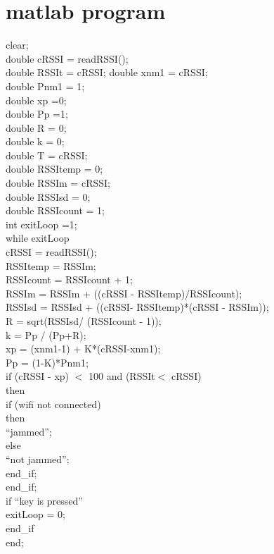 \documentclass[a4paper,10pt]{article}
\begin{document}
\section{matlab program}
clear;\\
double cRSSI = readRSSI(); \\
double RSSIt = cRSSI;
double xnm1 = cRSSI;\\
double Pnm1 = 1; \\
double xp =0;\\
double Pp =1;\\
double R = 0;\\
double k = 0;\\
double T = cRSSI;\\
double RSSItemp = 0;\\
double RSSIm = cRSSI;\\
double RSSIsd = 0;\\
double RSSIcount = 1;\\
int exitLoop =1;\\
while exitLoop\\
\indent  cRSSI = readRSSI();\\
\indent  RSSItemp = RSSIm;\\
\indent  RSSIcount = RSSIcount + 1;\\
\indent  RSSIm = RSSIm + ((cRSSI - RSSItemp)/RSSIcount);\\
\indent  RSSIsd = RSSIsd +  ((cRSSI- RSSItemp)*(cRSSI - RSSIm));\\
\indent  R = sqrt(RSSIsd/ (RSSIcount - 1));\\
\indent  k = Pp / (Pp+R);\\
\indent  xp = (xnm1-1) + K*(cRSSI-xnm1);\\
\indent  Pp = (1-K)*Pnm1;\\
\indent  if (cRSSI - xp) $<$ 100 and (RSSIt$<$ cRSSI)\\
\indent  then \\
\indent \indent if (wifi not connected) \\
\indent \indent then \\
\indent \indent \indent ``jammed'';\\
\indent \indent else \\
\indent \indent \indent ``not jammed''; \\
\indent \indent end\_if;\\
\indent  end\_if;\\
\indent  if ``key is pressed''\\
\indent\indent    exitLoop = 0;\\
\indent  end\_if\\
end; 
\end{document}
